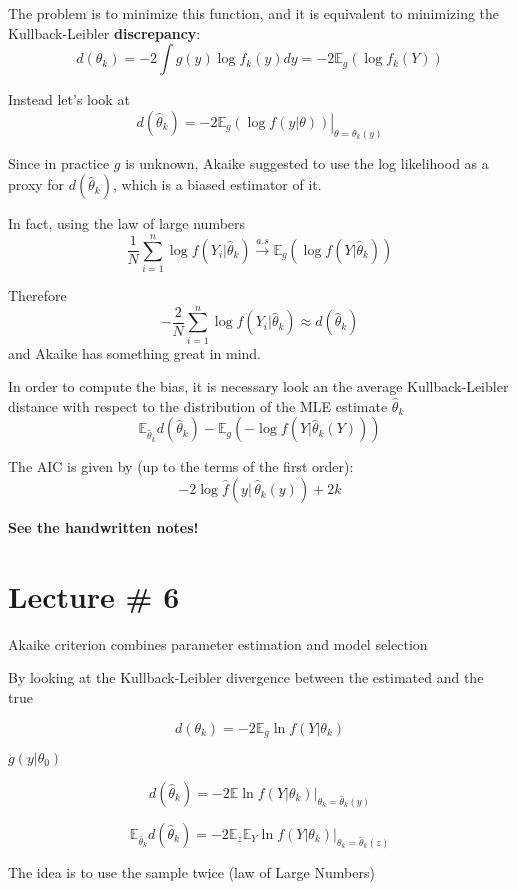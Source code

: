 \documentclass[a4paper]{article}
\newcommand{\brac}[1]{{\left ( #1 \right )}}
\newcommand{\induc}[1]{{\left . #1 \right \vert}}
\newcommand{\Ex}[0]{{\mathbb{E}}}
\begin{document}
The problem is to minimize this function, and it is equivalent to minimizing the Kullback-Leibler \textbf{discrepancy}:
\[d(\theta_k) = -2\int g(y) \log f_k(y) dy = - 2 \Ex_g\brac{\log f_k(Y)}\]

Instead	let's look at
\[d(\hat{\theta}_k) = - 2\induc{\Ex_g\brac{\log f(\induc{y}\theta)}}_{\theta=\theta_k(y)} \]

Since in practice $g$ is unknown, Akaike suggested to use the log likelihood as a proxy for $d(\hat{\theta}_k)$, which is a biased estimator of it.

In fact, using the law of large numbers
\[\frac{1}{N} \sum_{i=1}^n \log f(Y_i|\hat{\theta}_k) \overset{a.s}{\to} \Ex_g\brac{\log f(\induc{Y}\hat{\theta}_k)}\]

Therefore
\[-\frac{2}{N} \sum_{i=1}^n \log f(Y_i|\hat{\theta}_k) \approx d(\hat{\theta}_k)\] and Akaike has something great in mind.

In order to compute the bias, it is necessary look an the average Kullback-Leibler distance with respect to the distribution of the MLE estimate $\hat{\theta}_k$
\[\Ex_{\hat{\theta}_k} d(\hat{\theta}_k) - \Ex_g\brac{- \log f\brac{\induc{Y}\hat{\theta}_k(Y)}}\]

The AIC is given by (up to the terms of the first order):
\[-2\log \hat{f}\brac{\induc{y}\,\hat{\theta}_k(y)} + 2k\]

\textbf{ See the handwritten notes! }



\section{Lecture \# 6} %
\label{sec:lecture_6}

Akaike criterion combines parameter estimation and model selection

By looking at the Kullback-Leibler divergence between the estimated and the true

\[d(\theta_k) = - 2 \Ex_g \ln f\brac{\induc{Y}\theta_k}\]

$g(y\vert \theta_0)$

\[d(\hat{\theta}_k) = - 2 \induc{\Ex \ln f\brac{\induc{Y}\theta_k}}_{\theta_k = \hat{\theta}_k(y)}\]

\[\Ex_{\hat{\theta}_k} d(\hat{\theta}_k) = - 2 \induc{\Ex_z \Ex_Y \ln f\brac{\induc{Y}\theta_k}}_{\theta_k = \hat{\theta}_k(z)}\]

The idea is to use the sample twice (law of Large Numbers)
\end{document}
